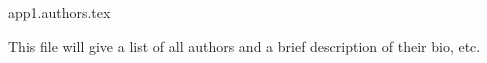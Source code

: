 app1.authors.tex

This file will give a list of all authors and a brief description of their bio, etc. 
